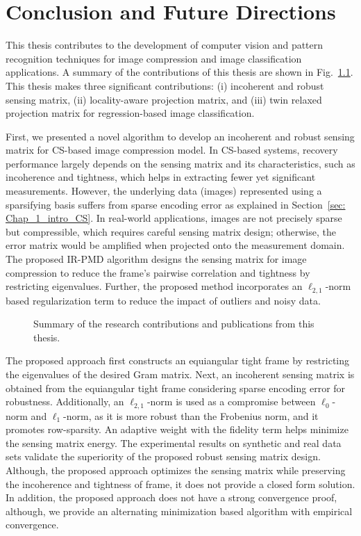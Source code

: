 \chapter{Conclusion and Future Directions}
\label{chap:chap8}
%
This thesis contributes to the development of computer vision and pattern recognition techniques for image compression and image classification applications. A summary of the contributions of this thesis are shown in Fig.~\ref{fig: Thesis_work}. This thesis makes three significant contributions: (i) incoherent and robust sensing matrix, (ii) locality-aware projection matrix, and (iii) twin relaxed projection matrix for regression-based image classification.

First, we presented a novel algorithm to develop an incoherent and robust sensing matrix for CS-based image compression model. In CS-based systems, recovery performance largely depends on the sensing matrix and its characteristics, such as incoherence and tightness, which helps in extracting fewer yet significant measurements. However, the underlying data (images) represented using a sparsifying basis suffers from sparse encoding error as explained in Section~\ref{sec: Chap_1_intro_CS}. In real-world applications, images are not precisely sparse but compressible, which requires careful sensing matrix design; otherwise, the error matrix would be amplified when projected onto the measurement domain. The proposed IR-PMD algorithm designs the sensing matrix for image compression to reduce the frame's pairwise correlation and tightness by restricting eigenvalues. Further, the proposed method incorporates an $\ell_{2,1}$-norm based regularization term to reduce the impact of outliers and noisy data.
%
\begin{figure}
   \centering
   \scalebox{.7}{}
 \caption{Summary of the research contributions and publications from this thesis.}
    \label{fig: Thesis_work}
\end{figure}
%
The proposed approach first constructs an equiangular tight frame by restricting the eigenvalues of the desired Gram matrix. Next, an incoherent sensing matrix is obtained from the equiangular tight frame considering sparse encoding error for robustness. Additionally, an $\ell_{2,1}$-norm is used as a compromise between $\ell_{0}$-norm and $\ell_{1}$-norm, as it is more robust than the Frobenius norm, and it promotes row-sparsity. An adaptive weight with the fidelity term helps minimize the sensing matrix energy. The experimental results on synthetic and real data sets validate the superiority of the proposed robust sensing matrix design. Although, the proposed approach optimizes the sensing matrix while preserving the incoherence and tightness of frame, it does not provide a closed form solution. In addition, the proposed approach does not have a strong convergence proof, although, we provide an alternating minimization based algorithm with empirical convergence.

